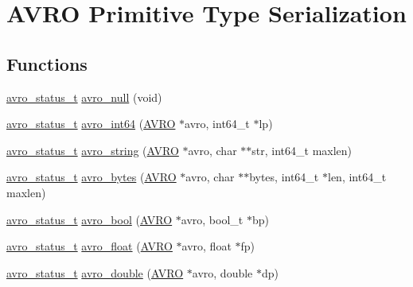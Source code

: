 \hypertarget{group___primitives}{
\section{AVRO Primitive Type Serialization}
\label{group___primitives}
}
\subsection*{Functions}
\begin{CompactItemize}
\item 
\hyperlink{group___handle___routines_g4271ca78aabaaad628d7b632aa5a1499}{avro\_\-status\_\-t} \hyperlink{group___primitives_gad3a89fbddd4853036ed861dba1ee2c1}{avro\_\-null} (void)
\item 
\hyperlink{group___handle___routines_g4271ca78aabaaad628d7b632aa5a1499}{avro\_\-status\_\-t} \hyperlink{group___primitives_gef604d6a5f83d9769b4c5d47e8b505f2}{avro\_\-int64} (\hyperlink{struct_a_v_r_o}{AVRO} $\ast$avro, int64\_\-t $\ast$lp)
\item 
\hyperlink{group___handle___routines_g4271ca78aabaaad628d7b632aa5a1499}{avro\_\-status\_\-t} \hyperlink{group___primitives_g4d568c22cdd854ea5a9c85ed622f7d91}{avro\_\-string} (\hyperlink{struct_a_v_r_o}{AVRO} $\ast$avro, char $\ast$$\ast$str, int64\_\-t maxlen)
\item 
\hyperlink{group___handle___routines_g4271ca78aabaaad628d7b632aa5a1499}{avro\_\-status\_\-t} \hyperlink{group___primitives_g883aa71b77043b51296ab278c2a84a23}{avro\_\-bytes} (\hyperlink{struct_a_v_r_o}{AVRO} $\ast$avro, char $\ast$$\ast$bytes, int64\_\-t $\ast$len, int64\_\-t maxlen)
\item 
\hyperlink{group___handle___routines_g4271ca78aabaaad628d7b632aa5a1499}{avro\_\-status\_\-t} \hyperlink{group___primitives_ga230ba9c2028579916da8e3ef7abbb07}{avro\_\-bool} (\hyperlink{struct_a_v_r_o}{AVRO} $\ast$avro, bool\_\-t $\ast$bp)
\item 
\hyperlink{group___handle___routines_g4271ca78aabaaad628d7b632aa5a1499}{avro\_\-status\_\-t} \hyperlink{group___primitives_ge1346e273aa3d82cc324992f081c6a49}{avro\_\-float} (\hyperlink{struct_a_v_r_o}{AVRO} $\ast$avro, float $\ast$fp)
\item 
\hyperlink{group___handle___routines_g4271ca78aabaaad628d7b632aa5a1499}{avro\_\-status\_\-t} \hyperlink{group___primitives_g16c546852402edffa666a3cd214d4f7c}{avro\_\-double} (\hyperlink{struct_a_v_r_o}{AVRO} $\ast$avro, double $\ast$dp)
\end{CompactItemize}


